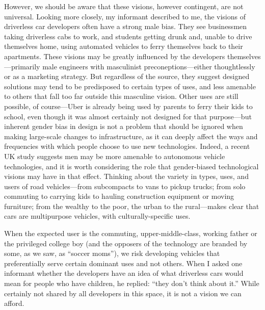 However, we should be aware that these visions, however contingent,
are not universal. Looking more closely, my informant described to me, the visions
of driverless car developers
often have a strong male bias. They see businessmen
taking driverless cabs to work, and students getting drunk and, unable
to drive themselves home, using automated vehicles to ferry themselves
back to their apartments. These visions may be greatly influenced by
the developers themselves---primarily male engineers with masculinist
preconeptions---either thoughtlessly or as a marketing strategy. But
regardless of the source, they suggest designed solutions may tend to
be predisposed to certain types of uses, and less amenable to others
that fall too far outside this masculine vision. Other uses are still
possible, of course---Uber is already being used by parents to ferry
their kids to school, even though it was almost certainly not designed
for that
purpose\cite{???-http://healthland.time.com/2013/11/14/for-more-parents-its-uber-to-the-rescue/--http://www.nytimes.com/2013/09/26/fashion/moms-van-is-called-uber.html?_r=0}---but
inherent gender bias in design is not a problem that should be ignored
when making large-scale changes to infrastructure, as it can deeply
affect the ways and frequencies with which people choose to use new
technologies. Indeed, a recent UK study suggests men may be more
amenable to autonomous vehicle technologies, and it is worth
considering the role that gender-biased technological visions may have
in that
effect\cite{???-http://www.nytimes.com/2013/09/26/fashion/moms-van-is-called-uber.html?_r=0}.
Thinking about the variety in types, uses, and users of road vehicles---from
subcompacts to vans to pickup trucks; from solo commuting to carrying kids to
hauling construction equipment or moving furniture; from the wealthy
to the poor, the urban to the rural---makes clear that cars are
multipurpose vehicles, with culturally-specific uses. 


When the
expected user is the commuting, upper-middle-class, working father or
the privileged college boy (and the opposers of the technology are
branded by some, as we saw, as ``soccer moms''), we risk developing
vehicles that preferentially serve certain dominant uses and not
others. When I asked one informant whether the developers have an idea
of what driverless cars would mean for people who have children, he
replied:  ``they don't think about it.'' While certainly not shared by
all developers in this space, it is not a vision we can afford.

